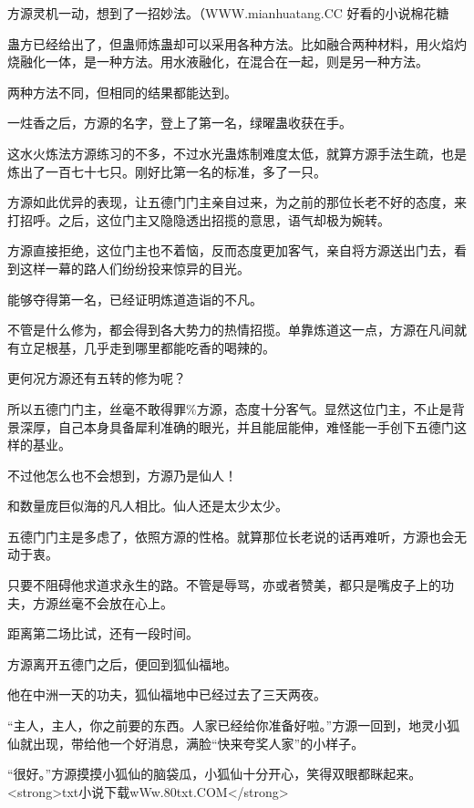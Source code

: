 
\begin{this_body}

方源灵机一动，想到了一招妙法。（WWW.mianhuatang.CC 好看的小说棉花糖

蛊方已经给出了，但蛊师炼蛊却可以采用各种方法。比如融合两种材料，用火焰灼烧融化一体，是一种方法。用水液融化，在混合在一起，则是另一种方法。

两种方法不同，但相同的结果都能达到。

一炷香之后，方源的名字，登上了第一名，绿曜蛊收获在手。

这水火炼法方源练习的不多，不过水光蛊炼制难度太低，就算方源手法生疏，也是炼出了一百七十七只。刚好比第一名的标准，多了一只。

方源如此优异的表现，让五德门门主亲自过来，为之前的那位长老不好的态度，来打招呼。之后，这位门主又隐隐透出招揽的意思，语气却极为婉转。

方源直接拒绝，这位门主也不着恼，反而态度更加客气，亲自将方源送出门去，看到这样一幕的路人们纷纷投来惊异的目光。

能够夺得第一名，已经证明炼道造诣的不凡。

不管是什么修为，都会得到各大势力的热情招揽。单靠炼道这一点，方源在凡间就有立足根基，几乎走到哪里都能吃香的喝辣的。

更何况方源还有五转的修为呢？

所以五德门门主，丝毫不敢得罪\%方源，态度十分客气。显然这位门主，不止是背景深厚，自己本身具备犀利准确的眼光，并且能屈能伸，难怪能一手创下五德门这样的基业。

不过他怎么也不会想到，方源乃是仙人！

和数量庞巨似海的凡人相比。仙人还是太少太少。

五德门门主是多虑了，依照方源的性格。就算那位长老说的话再难听，方源也会无动于衷。

只要不阻碍他求道求永生的路。不管是辱骂，亦或者赞美，都只是嘴皮子上的功夫，方源丝毫不会放在心上。

距离第二场比试，还有一段时间。

方源离开五德门之后，便回到狐仙福地。

他在中洲一天的功夫，狐仙福地中已经过去了三天两夜。

“主人，主人，你之前要的东西。人家已经给你准备好啦。”方源一回到，地灵小狐仙就出现，带给他一个好消息，满脸“快来夸奖人家”的小样子。

“很好。”方源摸摸小狐仙的脑袋瓜，小狐仙十分开心，笑得双眼都眯起来。<strong>txt小说下载wWw.80txt.COM</strong>


\end{this_body}
